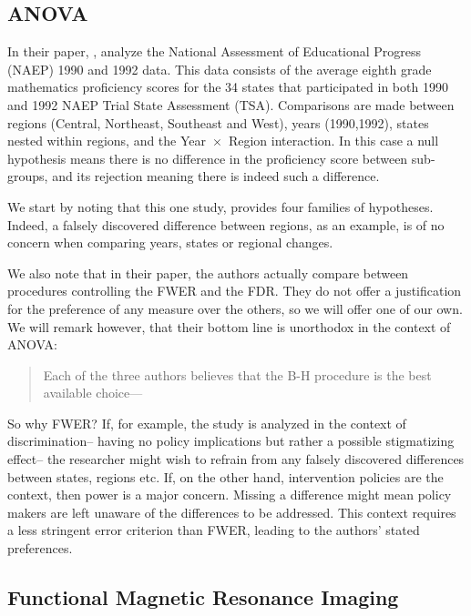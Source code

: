 \documentclass[review,12pt]{article}
\theoremstyle{definition}
\theoremstyle{definition}
\begin{document}
\subsection{\label{sec:anova}ANOVA}
In their \citeyear{williams_controlling_1999} paper, \citeauthor*{williams_controlling_1999}, analyze the National Assessment of Educational Progress (NAEP) 1990 and 1992 data. This data consists of the average eighth grade mathematics proficiency scores for the 34 states that participated in both 1990 and 1992 NAEP Trial State Assessment (TSA). Comparisons are made between regions (Central, Northeast, Southeast and West), years (1990,1992), states nested within regions, and the Year~$\times$~Region interaction. 
In this case a null hypothesis means there is no difference in the proficiency score between sub-groups, and its rejection meaning there is indeed such a difference.

We start by noting that this one study, provides four families of hypotheses. Indeed, a falsely discovered difference between regions, as an example, is of no concern when comparing years, states or regional changes.

We also note that in their paper, the authors actually compare between procedures controlling the FWER and the FDR. They do not offer a justification for the preference of any measure over the others, so we will offer one of our own. We will remark however, that their bottom line is unorthodox in the context of ANOVA: 
\begin{quote}
Each of the three authors believes that the B-H procedure is the best available choice--- \citeauthor*{williams_controlling_1999}
\end{quote}

So why FWER? If, for example, the study is analyzed in the context of discrimination-- having no policy implications but rather a possible stigmatizing effect-- the researcher might wish to refrain from any falsely discovered differences between states, regions etc. If, on the other hand, intervention policies are the context, then power is a major concern. Missing a difference might mean policy makers are left unaware of the differences to be addressed. This context requires a less stringent error criterion than FWER, leading to the authors' stated preferences.





\subsection{\label{sub:fMRI}Functional Magnetic Resonance Imaging}
\end{document}
